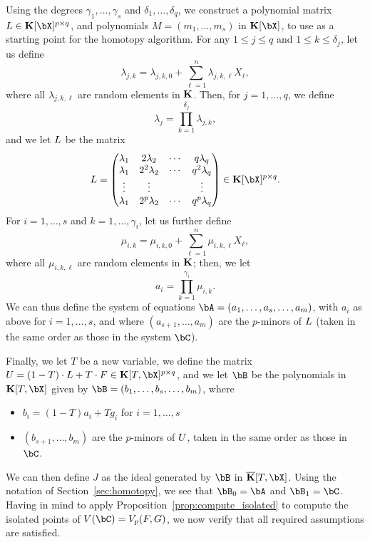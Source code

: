\documentclass[12pt]{article}
\begin{document}
Using the degrees $\gamma_1,\dots,\gamma_s$ and  $\delta_1,\dots,\delta_q$, we construct a polynomial matrix $\mL \in
\KK[\bX]^{p \times q}$, and polynomials $M=(m_1,\dots,m_s)$ in
$\KK[\bX]$, to use as a starting point for the homotopy
algorithm. For any $1 \leq j \leq q$ and $1 \leq k \leq \delta_j$, let us
define $$\lambda_{j,k} = \lambda_{j,k,0} + \sum_{\ell = 1}^{n}\lambda_{j,k,\ell}X_\ell,$$ 
where all $\lambda_{j,k,\ell}$ are random elements in
$\mathbf{K}$. Then, for $j=1,\dots,q$, we define
$$\lambda_j = \prod_{k=1}^{\delta_j}\lambda_{j,k},$$
and we let  ${L}$ be the matrix
\begin{align}\label{eqdef:col}
\mL = 
\left( \begin{matrix}
\lambda_1 & 2\lambda_2 & \cdots & q\lambda_{q}\\
\lambda_1 & 2^2\lambda_2 & \cdots & q^2\lambda_q\\
\vdots & \vdots &  & \vdots \\
\lambda_1 & 2^p\lambda_2 & \cdots & q^p\lambda_q
\end{matrix} \right) \in \KK[\bX]^{p\times q}.
\end{align}
For $i=1,\dots,s$ and $k=1,\dots,\gamma_i$, let us further define
$$\mu_{i,k} =  \mu_{i,k,0} + \sum_{\ell = 1}^{n}\mu_{i,k,\ell}X_\ell,$$ where
all $\mu_{i,k,\ell}$ are random elements in $\mathbf{K}$; then, we let
$$a_i=\prod_{k=1}^{\gamma_i} \mu_{i,k}.$$ We can thus define the
system of equations $\bA=(a_1,\dots,a_s,\dots,a_m)$, with $a_i$ as
above for $i=1,\dots,s$, and where $(a_{s+1},\dots,a_{m})$ are the
$p$-minors of ${L}$ (taken in the same order as those in the system
$\bC$).

Finally, we let $T$ be a new variable, we define the matrix
$\mU=(1-T)\cdot \mL + T \cdot \mF \in \KK[T,\bX]^{p\times q}$, and we let $\bB$ be the polynomials in
$\KK[T,\bX]$ given by $\bB=(b_1,\dots,b_s,\dots,b_m)$, where
\begin{itemize}
\item $b_i=(1-T) a_i + T g_i$ for $i=1,\dots,s$
\item $(b_{s+1},\dots,b_{m})$ are the $p$-minors of ${U}$, taken in
  the same order as those in $\bC$.
\end{itemize}
We can then define $J$ as the ideal generated by $\bB$ in
$\KKbar[T,\bX]$. Using the notation of Section~\ref{sec:homotopy}, we
see that $\bB_0=\bA$ and $\bB_1=\bC$. Having in mind
to apply Proposition~\ref{prop:compute_isolated} to compute the
isolated points of $V(\bC)=\VpFG{p}{\mF}{G}$, we now verify that all
required assumptions are satisfied.
\end{document}
